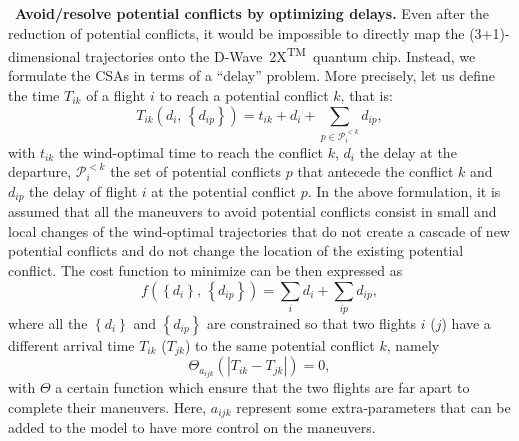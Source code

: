 \documentclass[9pt]{extarticle}
\newcommand{\DW}{\mbox{D-Wave 2X\textsuperscript{TM}}~}
\begin{document}
\begin{changemargin}{0.5cm}{0.5cm}
\textbullet~\textbf{Avoid/resolve potential conflicts by optimizing delays.} Even after the reduction of potential conflicts, it would be impossible to directly
map the (3+1)-dimensional trajectories onto the \DW quantum chip. Instead, we formulate the CSAs in terms of a ``delay'' problem. More precisely,
let us define the time $T_{ik}$ of a flight $i$ to reach a potential conflict $k$, that is:
\begin{equation}\label{eq:T}
	T_{ik}(d_i,\,\left\{d_{ip}\right\}) = t_{ik} + d_i + \sum_{p\in \mathcal{P}^{<k}_i} d_{ip},
\end{equation}
with $t_{ik}$ the wind-optimal time to reach the conflict $k$, $d_i$ the delay at the departure, 
$\mathcal{P}^{<k}_{i}$ the set of potential conflicts $p$ that antecede the conflict $k$ and $d_{ip}$ the delay
of flight $i$ at the potential conflict $p$. In the above formulation, it is assumed that all the maneuvers to avoid potential conflicts
consist in small and local changes of the wind-optimal trajectories that do not create a cascade of new potential conflicts and do not
change the location of the existing potential conflict. The cost function to minimize can be then expressed as
\begin{equation}\label{eq:f}
	f(\left\{d_i\right\},\,\left\{d_{ip}\right\})= \sum_{i} d_i + \sum_{ip} d_{ip},
\end{equation}
where all the $\left\{d_i\right\}$ and $\left\{d_{ip}\right\}$ are constrained so that two flights $i$ ($j$) have a different arrival time
$T_{ik}$ ($T_{jk}$) to the same potential conflict $k$, namely
\begin{equation}\label{eq:theta}
	\Theta_{a_{ijk}}(\left|T_{ik} - T_{jk}\right|) = 0,
\end{equation}
with $\Theta$ a certain function which ensure that the two flights are far apart to complete their maneuvers. Here, $a_{ijk}$ represent
some extra-parameters that can be added to the model to have more control on the maneuvers.
\end{changemargin}
\end{document}
